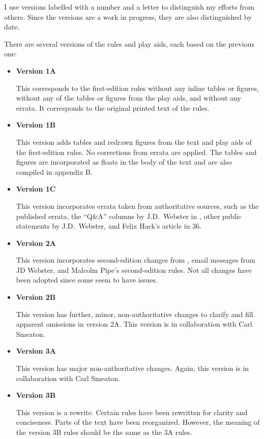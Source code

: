 \documentclass[10pt]{report}
\begin{document}
I use versions labelled with a number and a letter to distinguish my efforts from others. Since the versions are a work in progress, they are also distinguished by date.

There are several versions of the rules and play aids, each based on the previous one:

\begin{itemize}
    \item {\bfseries Version 1A}
    
    This corresponds to the first-edition {\AirPow} rules without any inline tables or figures, without any of the tables or figures from the play aids, and without any errata. It corresponds to the original printed text of the rules.


    \item {\bfseries Version 1B}
    
    This version adds tables and redrawn figures from the text and play aids of the first-edition {\AirPow} rules. No corrections from errata are applied. The tables and figures are incorporated as floats in the body of the text  and are also compiled in appendix B.
    
    \item {\bfseries Version 1C}
    
    This version incorporates errata taken from authoritative sources, such as the published errata, the “Q\&A” columns by J.D.\ Webster in {\APJ}, other public statements by J.D.\ Webster, and Felix Hack's article in {\APJ} 36.

    \item {\bfseries Version 2A}
    
    This version incorporates second-edition changes from {\APJ}, email messages from JD Webster, and Malcolm Pipe's second-edition rules. Not all changes have been adopted since some seem to have issues.

    \item {\bfseries Version 2B}
    
    This version has further, minor, non-authoritative changes to clarify and fill apparent omissions in version 2A. This version is in collaboration with Carl Smeaton.

    \item {\bfseries Version 3A}
    
    This version has major non-authoritative changes. Again, this version is in collaboration with Carl Smeaton.

    \item {\bfseries Version 3B}
    
    This version is a rewrite. Certain rules have been rewritten for clarity and conciseness. Parts of the text have been reorganized. However, the meaning of the version 3B rules should be the same as the 3A rules.
\end{itemize}
\end{document}
